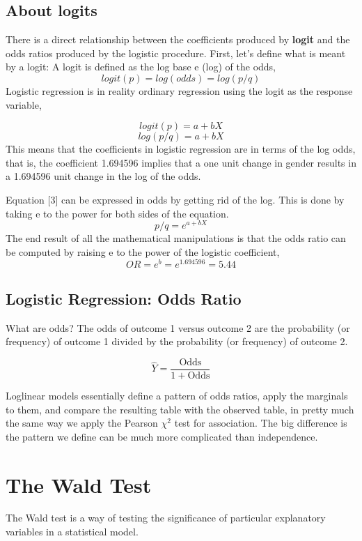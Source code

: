 \documentclass[a4paper,12pt]{article}
\begin{document}
\subsection{About logits}


There is a direct relationship between the coefficients produced by \textbf{logit} and the odds ratios produced by the logistic procedure.  First, let's define what is meant by a logit:  A logit is defined as the log base e (log) of the odds,
\[logit(p) = log(odds) = log(p/q)\]
Logistic regression is in reality ordinary regression using the logit as the response variable,

\[logit(p) = a + bX\]
\[log(p/q) = a + bX\]
This means that the coefficients in logistic regression are in terms of the log odds, that is, the coefficient 1.694596 implies that a one unit change in gender results in a 1.694596 unit change in the log of the odds.  

Equation [3] can be expressed in odds by getting rid of the log.  This is done by taking e to the power for both sides of the equation.
\[ p/q = e^{a + bX}\]
The end result of all the mathematical manipulations is that the odds ratio can be computed by raising e to the power of the logistic coefficient,
   \[OR = e^b = e^1.694596 = 5.44\]
\subsection{Logistic Regression: Odds Ratio}
What are odds?
The odds of outcome 1 versus outcome 2 are the probability (or frequency) of outcome 1 divided by the probability (or frequency) of outcome 2.


\[ \hat{Y} = \frac{\mbox{Odds}}{1+\mbox{Odds}} \]


Loglinear models essentially define a pattern of odds ratios, apply the marginals to them, and compare the resulting table with the observed table, in pretty much the same way we apply the Pearson  $\chi^2$ test for association. The big difference is the pattern we define can be much more complicated than independence.

\newpage
\section{The Wald Test}

The Wald test is a way of testing the significance of particular explanatory variables in a statistical model. 
\end{document}
